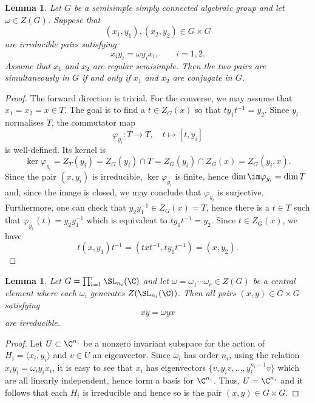 \documentclass[12pt, a4paper, oneside]{amsart}
\theoremstyle{plain} %
\newtheorem{lemma}[theorem]{Lemma}
\theoremstyle{definition} %
\theoremstyle{remark} %
\begin{document}
\begin{lemma}\label{lem:conjpairs}
Let $G$ be a semisimple simply connected algebraic group and let
$\omega\in Z(G)$. Suppose that
\[(x_1,y_1),(x_2,y_2)\in G\times G\]
are irreducible pairs satisfying
\[x_i y_i=\omega y_i x_i,\qquad i=1,2.\]
Assume that $x_1$ and $x_2$ are regular semisimple. Then the two pairs
are simultaneously in $G$ if and only if $x_1$ and $x_2$ are
conjugate in $G$.
\end{lemma}
\begin{proof}
The forward direction is trivial. For the converse, we may assume that $x_1=x_2=x\in T$. The goal is to find a $t\in Z_G(x)$ so that $ty_1 t^{-1}=y_2$. Since $y_i$ normalises $T$, the commutator map 
\[\varphi_{y_i}:T\longrightarrow T,\quad t\longmapsto [t,y_i]\] 
is well-defined. Its kernel is
\[\ker\varphi_{y_i} = Z_T(y_i)= Z_G(y_i)\cap T = Z_G(y_i)\cap Z_G(x) = Z_G(y_i,x).\]
Since the pair $(x,y_i)$ is irreducible, $\ker\varphi_{y_i}$ is finite, hence $\dim \im \varphi_{y_i} = \dim T$ and, since the image is closed, we may conclude that $\varphi_{y_i}$ is surjective. Furthermore, one can check that $y_2y_1^{-1}\in Z_G(x)=T$, hence there is a $t\in T$ such that $\varphi_{y_1}(t) = y_2y_1^{-1}$ which is equivalent to $ty_1t^{-1}=y_2$. Since $t\in Z_G(x)$, we have
\[t(x,y_1) t^{-1} = (txt^{-1},ty_1t^{-1})=(x,y_2). \]
\end{proof}


\begin{lemma}
Let $G = \prod_{i=1}^r \SL_{n_i}(\C)$ and let $\omega = \omega_1\cdots \omega_r\in Z(G)$ be a central element where each $\omega_i$ generates $Z(\SL_{n_i}(\C))$. Then all pairs $(x,y)\in G \times G$ satisfying 
\[xy = \omega yx \]
are irreducible.
\end{lemma}
\begin{proof}
Let $U\subset \C^{n_i}$ be a nonzero invariant subspace for the action of $H_i=\overline{\langle x_i,y_i\rangle}$ and $v\in U$ an eigenvector. Since $\omega_i$ has order $n_i$, using the relation $x_iy_i=\omega_i y_i x_i$, it is easy to see that $x_i$ has eigenvectors $\{v, y_iv,\dots, y_i^{n_i-1}v\}$ which are all linearly independent, hence form a basis for $\C^{n_i}$. Thus, $U=\C^{n_i}$ and it follows that each $H_i$ is irreducible and hence so is the pair $(x,y)\in G\times G$.
 
 \end{proof}
\end{document}
